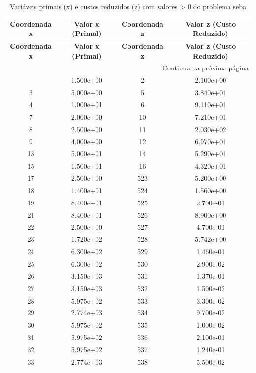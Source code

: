 \documentclass[12pt]{article}
\begin{document}
\begin{longtable}{@{}cccc@{}}
\caption{Variáveis primais (x) e custos reduzidos (z) com valores > 0 do problema seba} \\
\toprule
\textbf{Coordenada x} & \textbf{Valor x (Primal)} & \textbf{Coordenada z} & \textbf{Valor z (Custo Reduzido)} \\
\midrule
\endfirsthead

\toprule
\textbf{Coordenada x} & \textbf{Valor x (Primal)} & \textbf{Coordenada z} & \textbf{Valor z (Custo Reduzido)} \\
\midrule
\endhead

\midrule \multicolumn{4}{r}{{Continua na próxima página}} \\ \midrule
\endfoot

\bottomrule
\endlastfoot
1 & 1.500e+00 & 2 & 2.100e+00 \\
3 & 5.000e+00 & 5 & 3.840e+01 \\
4 & 1.000e+01 & 6 & 9.110e+01 \\
7 & 2.000e+00 & 10 & 7.210e+01 \\
8 & 2.500e+00 & 11 & 2.030e+02 \\
9 & 4.000e+00 & 12 & 6.970e+01 \\
13 & 5.000e+01 & 14 & 5.290e+01 \\
15 & 1.500e+01 & 16 & 4.320e+01 \\
17 & 2.500e+00 & 523 & 5.200e+00 \\
18 & 1.400e+01 & 524 & 1.560e+00 \\
19 & 8.400e+01 & 525 & 2.700e-01 \\
21 & 8.400e+01 & 526 & 8.900e+00 \\
22 & 2.500e+00 & 527 & 4.700e-01 \\
23 & 1.720e+02 & 528 & 5.742e+00 \\
24 & 6.300e+02 & 529 & 1.460e-01 \\
25 & 6.300e+02 & 530 & 2.900e-02 \\
26 & 3.150e+03 & 531 & 1.370e-01 \\
27 & 3.150e+03 & 532 & 1.500e-02 \\
28 & 5.975e+02 & 533 & 3.300e-02 \\
29 & 2.774e+03 & 534 & 9.700e-02 \\
30 & 5.975e+02 & 535 & 1.000e-02 \\
31 & 5.975e+02 & 536 & 2.100e-01 \\
32 & 5.975e+02 & 537 & 1.240e-01 \\
33 & 2.774e+03 & 538 & 5.500e-02 \\

\end{longtable}
\end{document}
